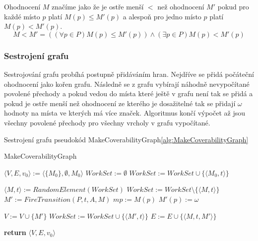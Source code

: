 \documentclass[
  biblatex,
  glossaries,
  index
]{kidiplom}
\begin{document}
Ohodnocení $M$ značíme jako že je ostře menší $<$ než ohodnocení $M'$
pokud pro každé místo $p$ platí $M(p) \leq M'(p)$ a alespoň pro jedno
místo $p$ platí $M(p) < M'(p)$.
$$
 M<M' = ((\forall p \in P) M(p) \leq M'(p)) \land (\exists p \in P) M(p) < M'(p)
$$

\subsubsection{Sestrojení grafu}

Sestrojování grafu probíhá postupně přidáváním hran. Nejdříve se přidá počáteční 
ohodnocení jako kořen grafu. Následně se z grafu vybírají náhodně
nevypočítané povolené přechody a pokud vedou do místa které ještě 
v grafu není tak se přidá a pokud je ostře menší než ohodnocení ze kterého
je dosažitelné tak se přidají $\omega$ hodnoty na místa ve kterých má více značek.
Algoritmus končí výpočet až jsou všechny povolené 
přechody pro všechny vrcholy v grafu vypočítané.

\begin{center}
  Sestrojení grafu pseudokód MakeCoverabilityGraph\ref{alg:MakeCoverabilityGraph}
\end{center}

\begin{algorithm}
  \caption{MakeCoverabilityGraph}\label{alg:MakeCoverabilityGraph}
  \begin{algorithmic}[1]
    \State $\langle V,E,v_0\rangle := \langle\{M_0\},\emptyset,M_0\rangle$
    \State $WorkSet := \emptyset $
    \State $WorkSet := WorkSet \cup \{\langle M_0, t \rangle\} $
    \EndFor

    \State $\langle M, t \rangle := RandomElement(WorkSet)$
    \State $WorkSet := WorkSet \setminus \{\langle M, t \rangle\}$
    \State $M' := FireTransition(P,t,A,M)$
    \State $mp := M(p)$
    \State $M'(p) := \omega$
    \EndIf
    \EndFor
    \EndFor

    \State $V := V \cup \{M'\}$
    \State $WorkSet := WorkSet \cup \{\langle M', t \rangle\} $
    \EndFor
    \EndIf
    \State $E := E \cup \{\langle M,t,M'\rangle\}$
    \EndWhile

    \State \textbf{return} $\langle V,E,v_0\rangle$
    \EndFunction
  \end{algorithmic}
\end{algorithm}
\end{document}
